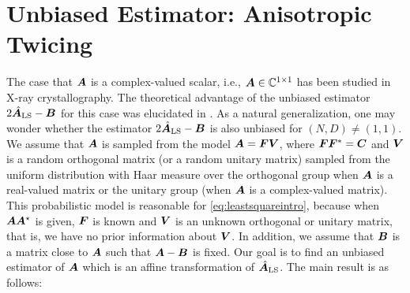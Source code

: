 \section{Unbiased Estimator: Anisotropic Twicing}
\label{sec:estimator}
The case that $\boldsymbol{A}$ is a complex-valued scalar, i.e., $\boldsymbol{A}\in\mathbb{C}^{1\times
1}$ has been studied in X-ray crystallography. The   theoretical advantage of 
the unbiased estimator $2\hat{\boldsymbol{A}}_{\text{LS}}-\boldsymbol{B}$ for this case was elucidated in 
\cite{Main1979}. As a natural generalization, one may wonder whether the 
estimator
$2\hat{\boldsymbol{A}}_{\text{LS}}-\boldsymbol{B}$ is also unbiased for $(N,D)\neq (1,1)$. We assume that $\boldsymbol{A}$ 
is sampled from the model $\boldsymbol{A}=\boldsymbol{F}\boldsymbol{V}$, where $\boldsymbol{F}\boldsymbol{F}^*=\boldsymbol{C}$ and $\boldsymbol{V}$ is a 
random orthogonal matrix (or a random unitary matrix) sampled from the uniform 
distribution with Haar measure over the orthogonal group when $\boldsymbol{A}$ is a 
real-valued matrix or the unitary group (when $\boldsymbol{A}$ is a complex-valued 
matrix). This probabilistic model is reasonable for \eqref{eq:leastsquareintro}, 
because when $\boldsymbol{A}\boldsymbol{A}^\star$ is given, $\boldsymbol{F}$ is known and $\boldsymbol{V}$ is an unknown 
orthogonal or unitary matrix, that is, we have no prior information about $\boldsymbol{V}$. 
In addition, we assume that $\boldsymbol{B}$ is a matrix close to $\boldsymbol{A}$ such that $\boldsymbol{A}-\boldsymbol{B}$ 
is fixed. Our goal is to find an unbiased estimator of $\boldsymbol{A}$ which is an affine 
transformation of $\hat{\boldsymbol{A}}_{\text{LS}}$. The main result is as follows:

